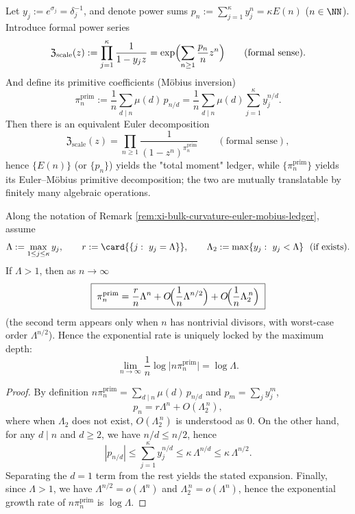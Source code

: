 \begin{remark}\label{rem:xi-bulk-curvature-euler-mobius-ledger}
Let \(y_j:=e^{\sigma_j}=\delta_j^{-1}\), and denote power sums
\(
p_n:=\sum_{j=1}^{\kappa}y_j^{n}=\kappa E(n)
\) (\(n\in\NN\)).
Introduce formal power series
\[
\mathfrak Z_{\mathrm{scale}}(z)
:=\prod_{j=1}^{\kappa}\frac{1}{1-y_j z}
=\exp\Bigl(\sum_{n\ge 1}\frac{p_n}{n}z^{n}\Bigr)
\qquad(\text{formal sense}).
\]
And define its primitive coefficients (Möbius inversion)
\[
\pi^{\mathrm{prim}}_n
:=\frac{1}{n}\sum_{d\mid n}\mu(d)\,p_{n/d}
=\frac{1}{n}\sum_{d\mid n}\mu(d)\sum_{j=1}^{\kappa}y_j^{n/d}.
\]
Then there is an equivalent Euler decomposition
\[
\mathfrak Z_{\mathrm{scale}}(z)=\prod_{n\ge 1}\frac{1}{(1-z^{n})^{\pi^{\mathrm{prim}}_n}}
\qquad(\text{formal sense}),
\]
hence \(\{E(n)\}\) (or \(\{p_n\}\)) yields the "total moment" ledger, while \(\{\pi^{\mathrm{prim}}_n\}\) yields its Euler--Möbius primitive decomposition; the two are mutually translatable by finitely many algebraic operations.
\end{remark}

\begin{proposition}\label{prop:xi-bulk-curvature-primitive-max-depth-dominance}
Along the notation of Remark \ref{rem:xi-bulk-curvature-euler-mobius-ledger}, assume
\[
\Lambda:=\max_{1\le j\le\kappa}y_j,\qquad
r:=\card{\{j:\ y_j=\Lambda\}},
\qquad
\Lambda_2:=\max\{y_j:\ y_j<\Lambda\}\ \ (\text{if exists}).
\]
If \(\Lambda>1\), then as \(n\to\infty\)
\[
\boxed{\;
\pi^{\mathrm{prim}}_n=\frac{r}{n}\Lambda^n
+O\!\Bigl(\frac{1}{n}\Lambda^{n/2}\Bigr)
+O\!\Bigl(\frac{1}{n}\Lambda_2^{\,n}\Bigr)\;}
\]
(the second term appears only when \(n\) has nontrivial divisors, with worst-case order \(\Lambda^{n/2}\)).
Hence the exponential rate is uniquely locked by the maximum depth:
\[
\boxed{\;\lim_{n\to\infty}\frac{1}{n}\log\bigl|n\pi^{\mathrm{prim}}_n\bigr|=\log\Lambda.\;}
\]
\end{proposition}
\begin{proof}
By definition \(n\pi^{\mathrm{prim}}_n=\sum_{d\mid n}\mu(d)\,p_{n/d}\) and \(p_m=\sum_{j}y_j^m\),
\[
p_n=r\Lambda^n+O(\Lambda_2^{\,n}),
\]
where when \(\Lambda_2\) does not exist, \(O(\Lambda_2^{\,n})\) is understood as \(0\).
On the other hand, for any \(d\mid n\) and \(d\ge 2\), we have \(n/d\le n/2\), hence
\[
|p_{n/d}|\le \sum_{j=1}^{\kappa}y_j^{n/d}\le \kappa\,\Lambda^{n/d}\le \kappa\,\Lambda^{n/2}.
\]
Separating the \(d=1\) term from the rest yields the stated expansion.
Finally, since \(\Lambda>1\), we have \(\Lambda^{n/2}=o(\Lambda^n)\) and \(\Lambda_2^{\,n}=o(\Lambda^n)\), hence the exponential growth rate of \(n\pi^{\mathrm{prim}}_n\) is \(\log\Lambda\).
\end{proof}

